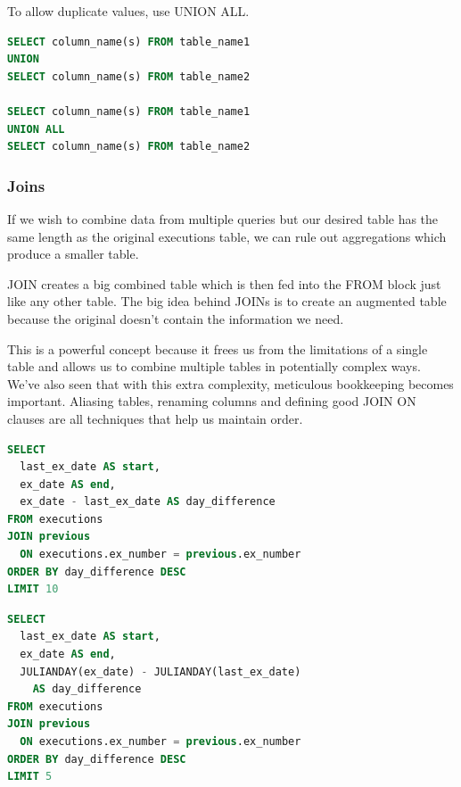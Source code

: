 \documentclass{article}
\begin{document}
To allow duplicate values, use UNION ALL.

\vspace{8pt} \begin{lstlisting}[language=SQL]
SELECT column_name(s) FROM table_name1
UNION
SELECT column_name(s) FROM table_name2

SELECT column_name(s) FROM table_name1
UNION ALL
SELECT column_name(s) FROM table_name2
\end{lstlisting} \vspace{8pt}

\subsubsection{Joins}

If we wish to combine data from multiple queries but our desired table has the same length as the original executions table, we can rule out aggregations which produce a smaller table.

JOIN creates a big combined table which is then fed into the FROM block just like any other table. The big idea behind JOINs is to create an augmented table because the original doesn't contain the information we need. 

This is a powerful concept because it frees us from the limitations of a single table and allows us to combine multiple tables in potentially complex ways. We’ve also seen that with this extra complexity, meticulous bookkeeping becomes important. Aliasing tables, renaming columns and defining good JOIN ON clauses are all techniques that help us maintain order.

\vspace{8pt} \begin{lstlisting}[language=SQL]
SELECT
  last_ex_date AS start,
  ex_date AS end,
  ex_date - last_ex_date AS day_difference
FROM executions
JOIN previous
  ON executions.ex_number = previous.ex_number
ORDER BY day_difference DESC
LIMIT 10
\end{lstlisting} \vspace{8pt}

\vspace{8pt} \begin{lstlisting}[language=SQL]
SELECT
  last_ex_date AS start,
  ex_date AS end,
  JULIANDAY(ex_date) - JULIANDAY(last_ex_date)
    AS day_difference
FROM executions
JOIN previous
  ON executions.ex_number = previous.ex_number
ORDER BY day_difference DESC
LIMIT 5
\end{lstlisting} \vspace{8pt}
\end{document}
